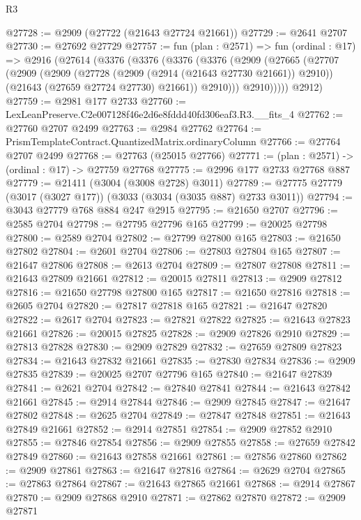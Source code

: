 \begin{lexlean}{R3}
\begin{coremodule}
@27728 := @2909 (@27722 (@21643 @27724 @21661))
@27729 := @2641 @2707
@27730 := @27692 @27729
@27757 := fun (plan : @2571) =>
  fun (ordinal : @17) =>
  @2916
    (@27614
      (@3376
        (@3376
          (@3376
            (@3376
              (@2909
                (@27665
                  (@27707
                    (@2909
                      (@2909
                        (@27728 (@2909 (@2914 (@21643 @27730 @21661)) @2910))
                        (@21643 (@27659 @27724 @27730) @21661))
                      @2910)))
                @2910)))))
      @2912)
@27759 := @2981 @177 @2733
@27760 := LexLeanPreserve.C2e007128f46e2d6e8fddd40fd306eaf3.R3.__fits_4
@27762 := @27760 @2707 @2499
@27763 := @2984 @27762
@27764 := PrismTemplateContract.QuantizedMatrix.ordinaryColumn
@27766 := @27764 @2707 @2499
@27768 := @27763 (@25015 @27766)
@27771 := (plan : @2571) -> (ordinal : @17) -> @27759 @27768
@27775 := @2996 @177 @2733 @27768 @887
@27779 := @21411 (@3004 (@3008 @2728) @3011)
@27789 := @27775 @27779 (@3017 (@3027 @177)) (@3033 (@3034 (@3035 @887) @2733 @3011))
@27794 := @3043 @27779 @768 @884 @247 @2915
@27795 := @21650 @2707
@27796 := @2585 @2704
@27798 := @27795 @27796 @165
@27799 := @20025 @27798
@27800 := @2589 @2704
@27802 := @27799 @27800 @165
@27803 := @21650 @27802
@27804 := @2601 @2704
@27806 := @27803 @27804 @165
@27807 := @21647 @27806
@27808 := @2613 @2704
@27809 := @27807 @27808
@27811 := @21643 @27809 @21661
@27812 := @20015 @27811
@27813 := @2909 @27812
@27816 := @21650 @27798 @27800 @165
@27817 := @21650 @27816
@27818 := @2605 @2704
@27820 := @27817 @27818 @165
@27821 := @21647 @27820
@27822 := @2617 @2704
@27823 := @27821 @27822
@27825 := @21643 @27823 @21661
@27826 := @20015 @27825
@27828 := @2909 @27826 @2910
@27829 := @27813 @27828
@27830 := @2909 @27829
@27832 := @27659 @27809 @27823
@27834 := @21643 @27832 @21661
@27835 := @27830 @27834
@27836 := @2909 @27835
@27839 := @20025 @2707 @27796 @165
@27840 := @21647 @27839
@27841 := @2621 @2704
@27842 := @27840 @27841
@27844 := @21643 @27842 @21661
@27845 := @2914 @27844
@27846 := @2909 @27845
@27847 := @21647 @27802
@27848 := @2625 @2704
@27849 := @27847 @27848
@27851 := @21643 @27849 @21661
@27852 := @2914 @27851
@27854 := @2909 @27852 @2910
@27855 := @27846 @27854
@27856 := @2909 @27855
@27858 := @27659 @27842 @27849
@27860 := @21643 @27858 @21661
@27861 := @27856 @27860
@27862 := @2909 @27861
@27863 := @21647 @27816
@27864 := @2629 @2704
@27865 := @27863 @27864
@27867 := @21643 @27865 @21661
@27868 := @2914 @27867
@27870 := @2909 @27868 @2910
@27871 := @27862 @27870
@27872 := @2909 @27871

\end{coremodule}
\end{lexlean}
